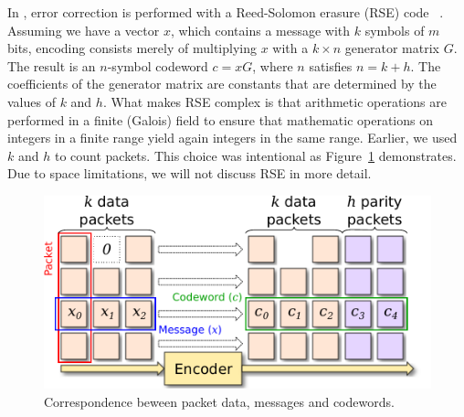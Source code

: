 
In \OurSys, error correction is performed with a Reed-Solomon erasure (RSE) code~\cite{rse}
.
Assuming we have a vector $x$,
which contains a message with $k$ symbols of $m$ bits, encoding consists merely
of multiplying $x$ with a $k \times n$ generator matrix $G$. The result is an
$n$-symbol codeword $c = xG$, where $n$ satisfies $n = k + h$.   The coefficients of the
generator matrix are constants that are determined by the values of $k$ and
$h$.
What makes RSE complex is that arithmetic operations are performed in a finite (Galois)
field to ensure that mathematic operations on integers in a finite range yield
again integers in the same range.  
Earlier, we used $k$ and $h$ to count packets.  This choice was intentional as
Figure~\ref{fig:Striping} demonstrates.
Due to space limitations, we will not discuss RSE in more detail.

\begin{figure}
  \centering
  \includegraphics[width=0.4\paperwidth]{Striping.pdf}
  \caption{\label{fig:Striping} Correspondence beween packet data, messages and codewords.
  }
\end{figure}

